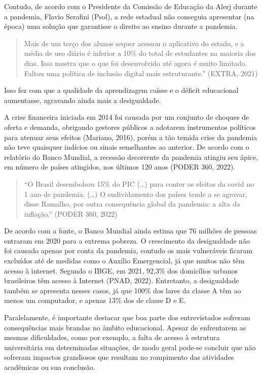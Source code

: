 \documentclass[
]{article}
\begin{document}
Contudo, de acordo com o Presidente da Comissão de Educação da Alerj
durante a pandemia, Flavio Serafini (Psol), a rede estadual não
conseguia apresentar (na época) uma solução que garantisse o direito ao
ensino durante a pandemia.

\begin{quote}
Mais de um terço dos alunos sequer acessou o aplicativo do estado, e a
média de uso diário é inferior a 10\% do total de estudantes na maioria
dos dias. Isso mostra que o que foi desenvolvido até agora é muito
limitado. Faltou uma política de inclusão digital mais estruturante.''
(EXTRA, 2021)
\end{quote}

Isso fez com que a qualidade da aprendizagem caísse e o déficit
educacional aumentasse, agravando ainda mais a desigualdade.

A crise financeira iniciada em 2014 foi causada por um conjunto de
choques de oferta e demanda, obrigando gestores públicos a adotarem
instrumentos políticos para atenuar seus efeitos (Mariano, 2016), porém
a tão temida crise da pandemia não teve quaisquer indícios ou sinais
semelhantes ao anterior. De acordo com o relatório do Banco Mundial, a
recessão decorrente da pandemia atingiu seu ápice, em número de países
atingidos, nos últimos 120 anos (PODER 360, 2022).

\begin{quote}
``O Brasil desembolsou 15\% do PIC (\ldots) para conter os efeitos da
covid no 1 ano de pandemia. (\ldots) O endividamento dos países tende a
se agravar, disse Ramalho, por outra consequência global da pandemia: a
alta da inflação.'' (PODER 360, 2022)
\end{quote}

De acordo com a fonte, o Banco Mundial ainda estima que 76 milhões de
pessoas entraram em 2020 para a extrema pobreza. O crescimento da
desigualdade não foi causado apenas por conta da pandemia, contudo os
mais vulneráveis ficaram excluídos até de medidas como o Auxílio
Emergencial, já que muitos não têm acesso à internet. Segundo o IBGE, em
2021, 92,3\% dos domicílios urbanos brasileiros têm acesso à Internet
(PNAD, 2022). Entretanto, a desigualdade também se apresenta nesses
casos, já que 100\% dos lares da classe A têm ao menos um computador, e
apenas 13\% dos de classe D e E.

Paralelamente, é importante destacar que boa parte dos entrevistados
sofreram consequências mais brandas no âmbito educacional. Apesar de
enfrentarem as mesmas dificuldades, como por exemplo, a falta de acesso
à estrutura universitária em determinadas situações, de modo geral
pode-se concluir que não sofreram impactos grandiosos que resultam no
rompimento das atividades acadêmicas ou sua conclusão.
\end{document}
